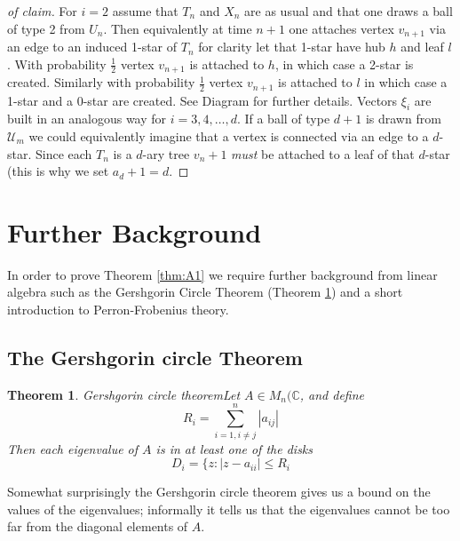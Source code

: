 \documentclass[oneside]{book} %
\newtheorem{thm}{Theorem}[section]
\theoremstyle{definition}
\numberwithin{equation}{section}
\begin{document}
\begin{proof}[of claim]
 For $i = 2$ assume that $T_n$ and $X_n$ are as usual and that one draws a ball of type 2 from $U_n$.  Then equivalently at time $n+1$ one attaches vertex $v_{n+1}$ via an edge to an induced 1-star of $T_n$ for clarity let that 1-star have hub $h$ and leaf $l$.  With probability $\frac{1}{2}$ vertex $v_{n+1}$ is attached to $h$, in which case a 2-star is created.  Similarly with probability $\frac{1}{2}$ vertex $v_{n+1}$ is attached to $l$ in which case a 1-star and a 0-star are created.  See Diagram %
 for further details.  Vectors $\xi_i$ are built in an analogous way for $i = 3,4,\dots,d$.  If a ball of type $d+1$ is drawn from $\mathcal{U}_m$ we could equivalently imagine that a vertex is connected via an edge to a $d$-star.  Since each $T_n$ is a $d$-ary tree $v_n+1$ \emph{must} be attached to a leaf of that $d$-star (this is why we set $a_d+1 = d$.  
 \end{proof} 




\section{Further Background}

In order to prove Theorem \ref{thm:A1} we require further background from linear algebra such as the Gershgorin Circle Theorem (Theorem \ref{thm:gct}) and a short introduction to Perron-Frobenius theory.

\subsection{The Gershgorin circle Theorem}

\begin{thm}{Gershgorin circle theorem}\label{thm:gct}
 Let $A \in M_n(\mathbb{C}$, and define 
 \[R_i = \sum_{i = 1, i \neq j}^n |a_{ij}|\]
 Then each eigenvalue of $A$ is in at least one of the disks 
\[D_{i} = \{z : | z-a_{ii}| \leq R_{i}\]
\end{thm}
Somewhat surprisingly the Gershgorin circle theorem gives us a bound on the values of the eigenvalues; informally it tells us that the eigenvalues cannot be too far from the diagonal elements of $A$. 
\end{document}

